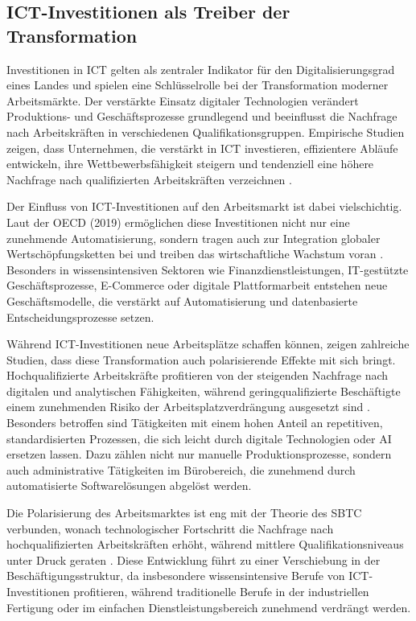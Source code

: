 \subsection{ICT-Investitionen als Treiber der Transformation}

Investitionen in \ac{ICT} gelten als zentraler Indikator für den Digitalisierungsgrad eines 
Landes und spielen eine Schlüsselrolle bei der Transformation moderner Arbeitsmärkte. Der 
verstärkte Einsatz digitaler Technologien verändert Produktions- und Geschäftsprozesse 
grundlegend und beeinflusst die Nachfrage nach Arbeitskräften in verschiedenen 
Qualifikationsgruppen. Empirische Studien zeigen, dass Unternehmen, die verstärkt in 
\ac{ICT} investieren, effizientere Abläufe entwickeln, ihre Wettbewerbsfähigkeit steigern 
und tendenziell eine höhere Nachfrage nach qualifizierten Arbeitskräften verzeichnen 
\parencite[vgl.][S. 12]{corrado2018intangible}.

Der Einfluss von \ac{ICT}-Investitionen auf den Arbeitsmarkt ist dabei vielschichtig. Laut 
der \ac{OECD} (2019) ermöglichen diese Investitionen nicht nur eine zunehmende 
Automatisierung, sondern tragen auch zur Integration globaler Wertschöpfungsketten bei 
und treiben das wirtschaftliche Wachstum voran 
\parencite[vgl.][S. 15-17]{oecd2019measuring}. Besonders in wissensintensiven Sektoren wie 
Finanzdienstleistungen, IT-gestützte Geschäftsprozesse, E-Commerce oder digitale 
Plattformarbeit entstehen neue Geschäftsmodelle, die verstärkt auf Automatisierung und 
datenbasierte Entscheidungsprozesse setzen.

Während \ac{ICT}-Investitionen neue Arbeitsplätze schaffen können, zeigen zahlreiche 
Studien, dass diese Transformation auch polarisierende Effekte mit sich bringt. 
Hochqualifizierte Arbeitskräfte profitieren von der steigenden Nachfrage nach digitalen 
und analytischen Fähigkeiten, während geringqualifizierte Beschäftigte einem zunehmenden 
Risiko der Arbeitsplatzverdrängung ausgesetzt sind 
\parencite[vgl.][Kap. 2]{brynjolfsson2014thesecond}. Besonders betroffen sind Tätigkeiten 
mit einem hohen Anteil an repetitiven, standardisierten Prozessen, die sich leicht durch 
digitale Technologien oder \ac{AI} ersetzen lassen. Dazu zählen nicht nur 
manuelle Produktionsprozesse, sondern auch administrative Tätigkeiten im Bürobereich, die 
zunehmend durch automatisierte Softwarelösungen abgelöst werden.

Die Polarisierung des Arbeitsmarktes ist eng mit der Theorie des \ac{SBTC} verbunden, 
wonach technologischer Fortschritt die Nachfrage nach hochqualifizierten Arbeitskräften 
erhöht, während mittlere Qualifikationsniveaus unter Druck geraten 
\parencite[vgl.][S. 22]{acemoglu2002technical}. Diese Entwicklung führt zu einer 
Verschiebung in der Beschäftigungsstruktur, da insbesondere wissensintensive Berufe von 
\ac{ICT}-Investitionen profitieren, während traditionelle Berufe in der industriellen 
Fertigung oder im einfachen Dienstleistungsbereich zunehmend verdrängt werden.


